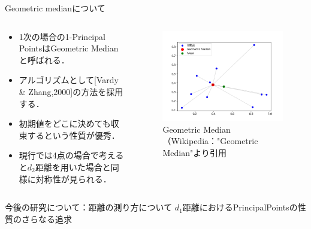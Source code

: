 \documentclass[unicode,11pt]{beamer}
\begin{document}
\begin{frame}{Geometric medianについて}
    \begin{columns}
        \begin{column}{0.48\textwidth}
            \begin{itemize}
                \item 1次の場合の1-Principal PointsはGeometric Medianと呼ばれる．
                \item アルゴリズムとして[Vardy \& Zhang,2000]の方法を採用する．
                \item 初期値をどこに決めても収束するという性質が優秀．
                \item 現行では4点の場合で考えると$d_2$距離を用いた場合と同様に対称性が見られる．
            \end{itemize}
        \end{column}
        \begin{column}{0.48\textwidth}
            \begin{figure}
                \centering
                \includegraphics[keepaspectratio, scale = 0.7]{Geometric_Median.png}
                \caption{Geometric Median（Wikipedia："Geometric Median"より引用}
                \label{Geometric_Median}
            \end{figure}
        \end{column}
    \end{columns}
\end{frame}

\begin{frame}{今後の研究について：距離の測り方について}
    $d_1$距離におけるPrincipalPointsの性質のさらなる追求
\end{frame}
\end{document}
